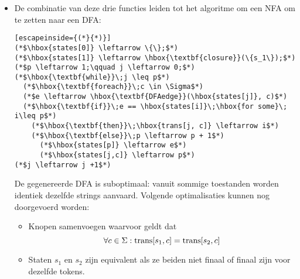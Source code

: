 \begin{itemize}
\begin{enumerate}
		Via deze functie, de startstaat $s_1$ en input string $c_1, ..., c_k$ kan de NFA simulatie als volgt geschreven worden:
			\begin{lstlisting}[escapeinside={(*}{*)}]
(*$d \leftarrow \hbox{\textbf{closure}}(\{s_1\})$*)
(*$\hbox{\textbf{for}}\; i \leftarrow 1\;\hbox{\textbf{to}}\;k$*)
  (*$d \leftarrow \hbox{\textbf{DFAedge}}(d, c_i)$*)
			\end{lstlisting}
	
		
	\end{enumerate}
	\item De combinatie van deze drie functies leiden tot het algoritme om een NFA om te zetten naar een DFA:
	\begin{lstlisting}[escapeinside={(*}{*)}]
(*$\hbox{states[0]} \leftarrow \{\};$*)
(*$\hbox{states[1]} \leftarrow \hbox{\textbf{closure}}(\{s_1\});$*)
(*$p \leftarrow 1;\qquad j \leftarrow 0;$*)
(*$\hbox{\textbf{while}}\;j \leq p$*)
  (*$\hbox{\textbf{foreach}}\;c \in \Sigma$*)
  (*$e \leftarrow \hbox{\textbf{DFAedge}}(\hbox{states[j]}, c)$*)
  (*$\hbox{\textbf{if}}\;e == \hbox{states[i]}\;\hbox{for some}\; i\leq p$*)
    (*$\hbox{\textbf{then}}\;\hbox{trans[j, c]} \leftarrow i$*)
    (*$\hbox{\textbf{else}}\;p \leftarrow p + 1$*)
      (*$\hbox{states[p]} \leftarrow e$*)
      (*$\hbox{states[j,c]} \leftarrow p$*)
(*$j \leftarrow j +1$*)
	\end{lstlisting}
	De gegenereerde DFA is suboptimaal: vanuit sommige toestanden worden identiek dezelfde strings aanvaard. Volgende optimalisaties kunnen nog doorgevoerd worden:
	\begin{itemize}
		\item Knopen samenvoegen waarvoor geldt dat 
		$$\forall c \in \Sigma: \hbox{trans}[s_1, c] = \hbox{trans}[s_2, c]$$
		\item Staten $s_1$ en $s_2$ zijn equivalent als ze beiden niet finaal of finaal zijn voor dezelfde tokens.
	\end{itemize}
\end{itemize}



